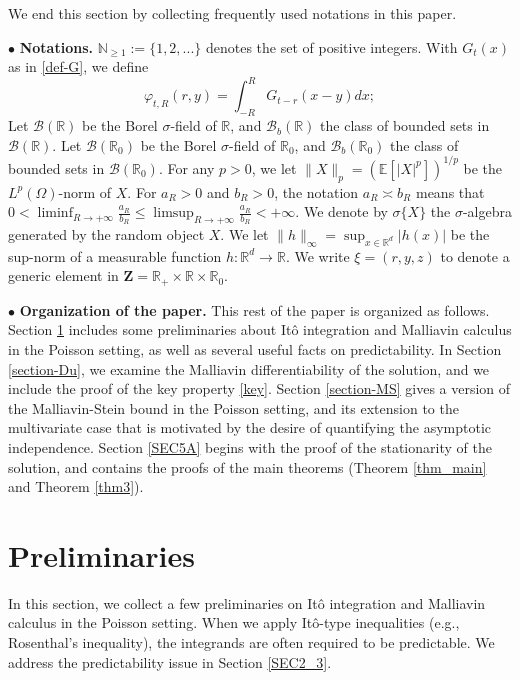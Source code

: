\documentclass[letterpaper, 11pt,  reqno]{amsart}
\newcommand{\noi}{\noindent}
\newcommand{\R}{\mathbb{R}}
\newcommand{\bul}{\bullet}
\newcommand{\bE}{\mathbb{E}}
\newcommand{\bR}{\mathbb{R}}
\newcommand{\cB}{\mathcal{B}}
\newcommand{\s}{\sigma}
\renewcommand{\O}{\Omega}
\newcommand{\N}{\mathbb{N}}
\numberwithin{equation}{section}
\numberwithin{theorem}{section}
\begin{document}
 

 

We end this section by collecting frequently used notations in this paper. 

\noi
$\bul$ {\bf Notations.} $\N_{\geq 1} := \{1,2, ...\}$ denotes
the set of positive integers. With   $G_t(x)$ as in \eqref{def-G},
we define 
\begin{equation}
\label{VTR}
\varphi_{t, R}(r, y) = \int_{-R}^R G_{t-r}(x-y)dx;
\end{equation}
  Let $\cB(\bR)$ be the Borel $\s$-field of $\bR$, and $\cB_b(\bR)$ the class of bounded sets in $\cB(\bR)$.
  Let $\cB(\bR_0)$ be the Borel $\s$-field of $\bR_0$, and $\cB_b(\bR_0)$ the class of bounded sets in $\cB(\bR_0)$.
  For any $p>0$, we let $\|X\|_p =(\bE[|X|^p])^{1/p}$ be the $L^p(\O)$-norm of $X$.
  For $a_R>0$ and $b_R>0$, the notation
$a_R\asymp b_R$ means that
$
0 < \liminf_{R\to+\infty} \frac{a_R}{b_R} \leq \limsup_{R\to+\infty}  \frac{a_R}{b_R} < +\infty.
$ 
  We denote by $\s\{X\}$ the $\s$-algebra generated
by the random object $X$. 
  We let $\|h\|_{\infty}=\sup_{x\in \bR^d}|h(x)|$ be the sup-norm of a
measurable  function $h:\bR^d \to \bR$.
  We write $\xi = (r, y,z)$ to denote a generic element in $\mathbf{Z} = \R_+\times\R\times\R_0$.

 
\smallskip 

 

\noi
$\bul$ {\bf Organization of the paper.} 
This rest of the paper is organized as follows. Section \ref{section-prelim} includes some preliminaries about It\^o integration and Malliavin calculus in the Poisson setting, as well as
several useful facts on predictability. In Section \ref{section-Du}, we examine the Malliavin differentiability of the solution, and we include the proof of the key property \eqref{key}.
Section \ref{section-MS} gives a version of the Malliavin-Stein bound in the Poisson setting, and its extension to the multivariate case that is motivated 
by the desire of quantifying the asymptotic independence.
Section \ref{SEC5A} begins with the proof of the stationarity of the solution, and contains the  proofs of the main theorems (Theorem \ref{thm_main} and Theorem \ref{thm3}). 




 
\section{Preliminaries}
\label{section-prelim}

 In this section, we collect a few preliminaries on It\^o integration
 and  Malliavin calculus in the Poisson setting. 
 When we apply It\^o-type 
 inequalities (e.g., Rosenthal's inequality), 
 the integrands are often required to be predictable.
 We address the predictability issue in Section \ref{SEC2_3}.
 
\end{document}
